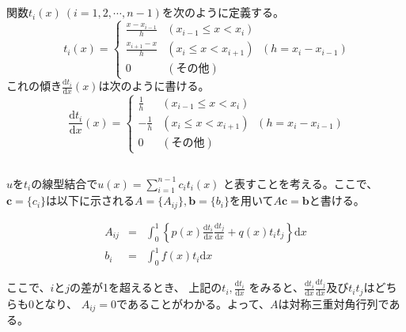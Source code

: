 \documentclass[a4j, titlepage]{jsarticle}
\numberwithin{equation}{section}
\begin{document}
        \subsection{}
            関数$t_i(x) \ (i=1,2,\cdots,n-1)$を次のように定義する。
            \begin{equation*}
                t_i(x) = \begin{cases}
                    \displaystyle\frac{x-x_{i-1}}{h} & (x_{i-1} \leq x < x_i) \\
                    \displaystyle\frac{x_{i+1}-x}{h} & (x_i \leq x < x_{i+1}) \\
                    0 & (その他)
                \end{cases} \ (h = x_i - x_{i-1})
            \end{equation*}
            これの傾き$\displaystyle\frac{\mathrm{d}t_i}{\mathrm{d}x}(x)$は次のように書ける。
            \begin{equation*}
                \frac{\mathrm{d}t_i}{\mathrm{d}x}(x) = \begin{cases}
                    \displaystyle\frac{1}{h} & (x_{i-1} \leq x < x_i) \\
                    \displaystyle-\frac{1}{h} & (x_i \leq x < x_{i+1}) \\
                    0 & (その他)
                \end{cases} \ (h = x_i - x_{i-1})
            \end{equation*}

        \subsection{}
            $u$を$t_i$の線型結合で$u(x)=\displaystyle\sum_{i=1}^{n-1}c_it_i(x)$
            と表すことを考える。ここで、$\bm{c}=\{c_i\}$は以下に示される$A=\{A_{ij}\},\bm{b}=\{b_i\}$を用いて$A\bm{c}=\bm{b}$と書ける。

            \begin{eqnarray*}
                A_{ij} &=& \int_0^1\left\{p(x)\frac{\mathrm{d}t_i}{\mathrm{d}x}\frac{\mathrm{d}t_j}{\mathrm{d}x}+q(x)t_it_j\right\}\mathrm{d}x \\
                b_i &=& \int_0^1f(x)t_i\mathrm{d}x
            \end{eqnarray*}

            ここで、$i$と$j$の差が1を超えるとき、
            上記の$t_i, \displaystyle\frac{\mathrm{d}t_i}{\mathrm{d}x}$
            をみると、$\displaystyle\frac{\mathrm{d}t_i}{\mathrm{d}x}\frac{\mathrm{d}t_j}{\mathrm{d}x}$及び$t_it_j$はどちらも0となり、
            $A_{ij}=0$であることがわかる。よって、$A$は対称三重対角行列である。
\end{document}

